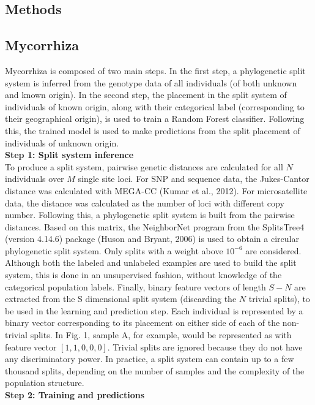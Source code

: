\documentclass[final]{bioinfo}
\begin{document}
\begin{methods}
\section{Methods}
\subsection{Mycorrhiza}
Mycorrhiza is composed of two main steps. In the first step, a phylogenetic split system is inferred from the genotype data of all individuals (of both unknown and known origin). In the second step, the placement in the split system of individuals of known origin, along with their categorical label (corresponding to their geographical origin), is used to train a Random Forest classifier. Following this, the trained model is used to make predictions from the split placement of individuals of unknown origin.\\
\textbf{Step 1: Split system inference}\\
To produce a split system, pairwise genetic distances are calculated for all $N$ individuals over $M$ single site loci. For SNP and sequence data, the Jukes-Cantor distance was calculated with MEGA-CC (Kumar et al., 2012). For microsatellite data, the distance was calculated as the number of loci with different copy number. Following this, a phylogenetic split system is built from the pairwise distances. Based on this matrix, the NeighborNet program from the SplitsTree4 (version 4.14.6) package (Huson and Bryant, 2006) is used to obtain a circular phylogenetic split system. Only splits with a weight above $10^{-6}$ are considered. Although both the labeled and unlabeled examples are used to build the split system, this is done in an unsupervised fashion, without knowledge of the categorical population labels. Finally, binary feature vectors of length $S - N$ are extracted from the S dimensional split system (discarding the $N$ trivial splits), to be used in the learning and prediction step. Each individual is represented by a binary vector corresponding to its placement on either side of each of the non-trivial splits. In Fig. 1, sample A, for example, would be represented as with feature vector $[1,1,0,0,0]$. Trivial splits are ignored because they do not have any discriminatory power. In practice, a split system can contain up to a few thousand splits, depending on the number of samples and the complexity of the population structure.\\
\textbf{Step 2: Training and predictions}\\

\end{methods}
\end{document}
